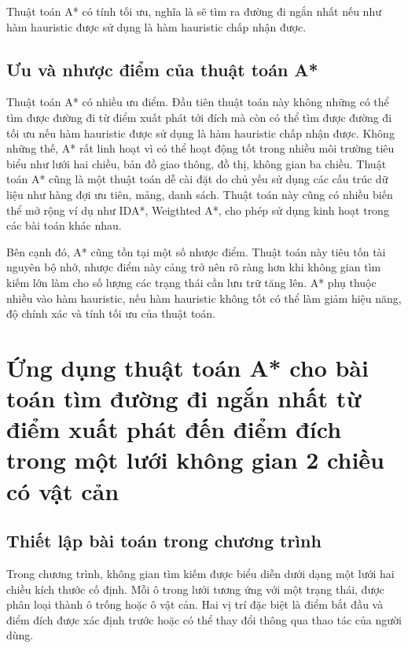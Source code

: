 \documentclass[12pt,a4paper]{report}
\begin{document}
\setlength{\parindent}{0pt}  
\setlength{\parskip}{6pt} 
Thuật toán A* có tính tối ưu, nghĩa là sẽ tìm ra đường đi ngắn nhất nếu như hàm hauristic được sử dụng là hàm hauristic chấp nhận được.
\subsection{Ưu và nhược điểm của thuật toán A*}
Thuật toán A* có nhiều ưu điểm. Đầu tiên thuật toán này không những có thể tìm được đường đi từ điểm xuất phát tới đích mà còn có thể tìm được đường đi tối ưu nếu hàm hauristic được sử dụng là hàm hauristic chấp nhận được. Không những thế, A* rất linh hoạt vì có thể hoạt động tốt trong nhiều môi trường tiêu biểu như lưới hai chiều, bản đồ giao thông, đồ thị, không gian ba chiều. Thuật toán A* cũng là một thuật toán dễ cài đặt  do chủ yếu sử dụng các cấu trúc dữ liệu như hàng đợi ưu tiên, mảng, danh sách. Thuật toán này cũng có nhiều biến thể mở rộng ví dụ như IDA*, Weigthted A*, cho phép sử dụng kinh hoạt trong các bài toán khác nhau.

\setlength{\parindent}{0pt}  
\setlength{\parskip}{6pt}    
Bên cạnh đó, A* cũng tồn tại một số nhược điểm. Thuật toán này tiêu tốn tài nguyên bộ nhớ, nhược điểm này cảng trở nên rõ ràng hơn khi không gian tìm kiếm lớn làm cho số lượng các trạng thái cần lưu trữ tăng lên. A* phụ thuộc nhiều vào hàm hauristic, nếu hàm hauristic không tốt có thể làm giảm hiệu năng, độ chính xác và tính tối ưu của thuật toán. 

\section{Ứng dụng thuật toán A* cho bài toán tìm đường đi ngắn nhất từ điểm xuất phát đến điểm đích trong một lưới không gian 2 chiều có vật cản}

\subsection{Thiết lập bài toán trong chương trình}
Trong chương trình, không gian tìm kiếm được biểu diễn dưới dạng một lưới hai chiều kích thước cố định. Mỗi ô trong lưới tương ứng với một trạng thái, được phân loại thành ô trống hoặc ô vật cản. Hai vị trí đặc biệt là điểm bắt đầu và điểm đích được xác định trước hoặc có thể thay đổi thông qua thao tác của người dùng.
\end{document}
